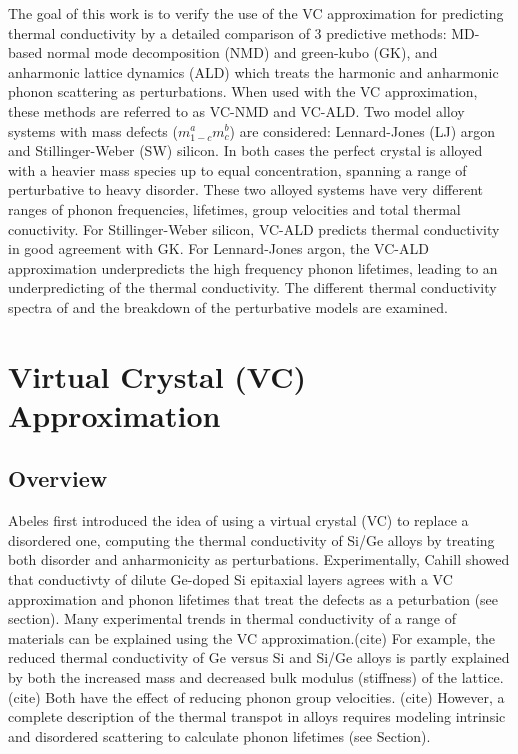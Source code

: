 \documentclass[aps,prb,twocolumn,superscriptaddress,preprintnumbers,amsmath,amssymb,floatfix]{revtex4}
\begin{document}
The goal of this work is to verify the use of the VC 
approximation for predicting thermal conductivity by a detailed comparison 
of 3 predictive methods: MD-based normal mode 
decomposition (NMD) and green-kubo (GK), 
and anharmonic lattice dynamics (ALD) which treats the harmonic and 
anharmonic phonon scattering as perturbations. When used with the VC 
approximation, these methods are referred to as VC-NMD and VC-ALD.
Two model alloy systems 
with mass defects ($m^a_{1-c}m^b_{c}$) are considered: 
Lennard-Jones (LJ) argon and Stillinger-Weber (SW) silicon. 
In both cases the perfect crystal is 
alloyed with a heavier mass species up to equal concentration, spanning 
a range of perturbative to heavy disorder. These 
two alloyed systems have very different ranges of phonon frequencies, 
lifetimes, group velocities and total thermal conuctivity. 
For Stillinger-Weber silicon, 
VC-ALD predicts thermal conductivity in good agreement with GK. 
For Lennard-Jones argon, the VC-ALD approximation underpredicts 
the high frequency phonon lifetimes, leading to an underpredicting of 
the thermal conductivity. The different thermal conductivity spectra of 
and the breakdown of the perturbative models are examined.

\section{\label{S:vc}Virtual Crystal (VC) Approximation}

\subsection{\label{S:overview}Overview}

Abeles first introduced the idea of using a virtual crystal (VC) to 
replace a disordered one, computing the
thermal conductivity of Si/Ge alloys by treating both
disorder and anharmonicity as perturbations.\cite{abeles_lattice_1963} 
Experimentally, 
Cahill showed that conductivty of dilute Ge-doped Si epitaxial layers
agrees with 
a VC approximation and phonon lifetimes that 
treat the defects as a peturbation (see section).
\cite{cahill_thermal_2004} 
Many experimental trends in thermal conductivity 
of a range of materials 
can be explained using the VC approximation.(cite) For example,
the reduced thermal conductivity of Ge versus Si and Si/Ge alloys 
is partly explained 
by both the increased mass and decreased bulk modulus (stiffness) of the 
lattice.(cite) Both have the effect of reducing phonon group velocities.
(cite) However, a complete 
description of the thermal transpot in alloys requires modeling intrinsic 
and 
disordered scattering to calculate phonon lifetimes (see Section).
\end{document}
